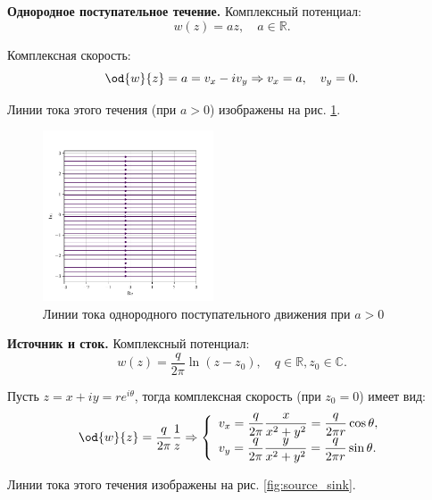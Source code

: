 \documentclass[a4paper, 14pt]{extarticle}
\begin{document}
\begin{problems}
\item 
\textbf{Однородное поступательное течение.}
Комплексный потенциал:
\[
	w(z) = a z,\quad
	a \in\mathbb{R}.
\]
		
Комплексная скорость:
\[
	\od{w}{z} = a = v_x - i v_y \Rightarrow
	v_x = a,\quad v_y = 0.
\]

Линии тока этого течения (при $a>0$) изображены на рис. \ref{fig:uniform_translation}.

\begin{figure}
	\centering
	\includegraphics[width=0.45\textwidth]{../img/uniform_translation.pdf}
	\caption{Линии тока однородного поступательного движения при $a>0$}
	\label{fig:uniform_translation}
\end{figure}


\item 
\textbf{Источник и сток.} Комплексный потенциал:
\[
	w(z) = \frac{q}{2\pi}\ln(z-z_0),\quad
	q \in\mathbb{R}, z_0\in\mathbb{C}.
\]
			
Пусть $z=x+iy=re^{i\theta}$, тогда комплексная скорость (при $z_0 = 0$) имеет вид:
\[
\od{w}{z} = \frac{q}{2\pi}\frac{1}{z} \Rightarrow
\left\{
\begin{array}{l}
\displaystyle v_x = \frac{q}{2 \pi}\frac{x}{x^2+y^2} = \frac{q}{2\pi r}\cos\theta,\\
\displaystyle v_y = \frac{q}{2 \pi}\frac{y}{x^2+y^2} = \frac{q}{2\pi r}\sin\theta.
\end{array}
\right.
\]


Линии тока этого течения изображены на рис. \ref{fig:source_sink}.


\end{problems}
\end{document}
